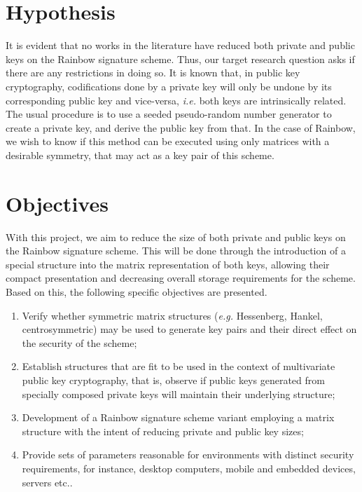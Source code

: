 \documentclass[10pt]{article}
\begin{document}
\section{Hypothesis}

It is evident that no works in the literature have reduced both private and public keys on the Rainbow signature scheme. Thus, our target research question asks if there are any restrictions in doing so. It is known that, in public key cryptography, codifications done by a private key will only be undone by its corresponding public key and vice-versa, \emph{i.e.} both keys are intrinsically related. The usual procedure is to use a seeded pseudo-random number generator to create a private key, and derive the public key from that. In the case of Rainbow, we wish to know if this method can be executed using only matrices with a desirable symmetry, that may act as a key pair of this scheme. 

\section{Objectives}

With this project, we aim to reduce the size of both private and public keys on the Rainbow signature scheme. This will be done through the introduction of a special structure into the matrix representation of both keys, allowing their compact presentation and decreasing overall storage requirements for the scheme. Based on this, the following specific objectives are presented.

\begin{enumerate}[label=\alph*.]
    \item Verify whether symmetric matrix structures (\emph{e.g.} Hessenberg, Hankel, centrosymmetric) may be used to generate key pairs and their direct effect on the security of the scheme;
    \item Establish structures that are fit to be used in the context of multivariate public key cryptography, that is, observe if public keys generated from specially composed private keys will maintain their underlying structure;
    \item Development of a Rainbow signature scheme variant employing a matrix structure with the intent of reducing private and public key sizes;
    \item Provide sets of parameters reasonable for environments with distinct security requirements, for instance, desktop computers, mobile and embedded devices, servers etc..
\end{enumerate}
\end{document}
